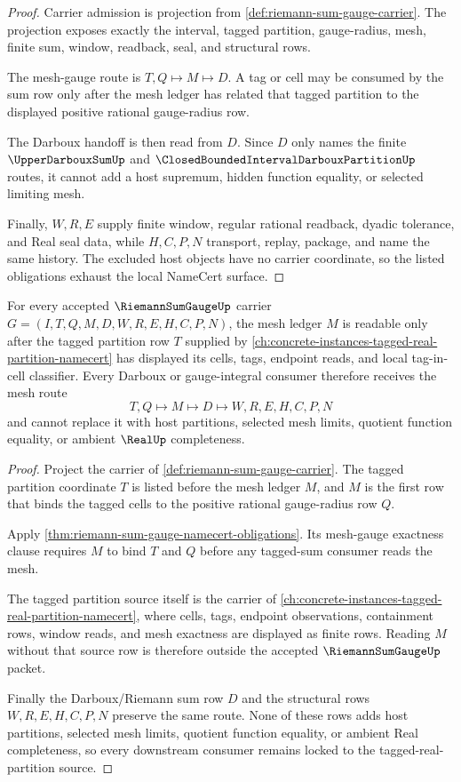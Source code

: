 \begin{proof}
Carrier admission is projection from \autoref{def:riemann-sum-gauge-carrier}. The projection exposes exactly the interval, tagged partition, gauge-radius, mesh, finite sum, window, readback, seal, and structural rows.

The mesh-gauge route is $T,Q\mapsto M\mapsto D$. A tag or cell may be consumed by the sum row only after the mesh ledger has related that tagged partition to the displayed positive rational gauge-radius row.

The Darboux handoff is then read from $D$. Since $D$ only names the finite $\UpperDarbouxSumUp$ and $\ClosedBoundedIntervalDarbouxPartitionUp$ routes, it cannot add a host supremum, hidden function equality, or selected limiting mesh.

Finally, $W,R,E$ supply finite window, regular rational readback, dyadic tolerance, and Real seal data, while $H,C,P,N$ transport, replay, package, and name the same history. The excluded host objects have no carrier coordinate, so the listed obligations exhaust the local NameCert surface.
\end{proof}

\begin{theorem}
\label{thm:riemann-sum-gauge-tagged-real-partition-source-lock}
For every accepted $\RiemannSumGaugeUp$ carrier $G=(I,T,Q,M,D,W,R,E,H,C,P,N)$, the mesh ledger $M$ is readable only after the tagged partition row $T$ supplied by \autoref{ch:concrete-instances-tagged-real-partition-namecert} has displayed its cells, tags, endpoint reads, and local tag-in-cell classifier. Every Darboux or gauge-integral consumer therefore receives the mesh route
$$
T,Q \longmapsto M \longmapsto D \longmapsto W,R,E,H,C,P,N
$$
and cannot replace it with host partitions, selected mesh limits, quotient function equality, or ambient $\RealUp$ completeness.
\end{theorem}
\begin{proof}
Project the carrier of \autoref{def:riemann-sum-gauge-carrier}. The tagged partition coordinate $T$ is listed before the mesh ledger $M$, and $M$ is the first row that binds the tagged cells to the positive rational gauge-radius row $Q$.

Apply \autoref{thm:riemann-sum-gauge-namecert-obligations}. Its mesh-gauge exactness clause requires $M$ to bind $T$ and $Q$ before any tagged-sum consumer reads the mesh.

The tagged partition source itself is the carrier of \autoref{ch:concrete-instances-tagged-real-partition-namecert}, where cells, tags, endpoint observations, containment rows, window reads, and mesh exactness are displayed as finite rows. Reading $M$ without that source row is therefore outside the accepted $\RiemannSumGaugeUp$ packet.

Finally the Darboux/Riemann sum row $D$ and the structural rows $W,R,E,H,C,P,N$ preserve the same route. None of these rows adds host partitions, selected mesh limits, quotient function equality, or ambient Real completeness, so every downstream consumer remains locked to the tagged-real-partition source.
\end{proof}

